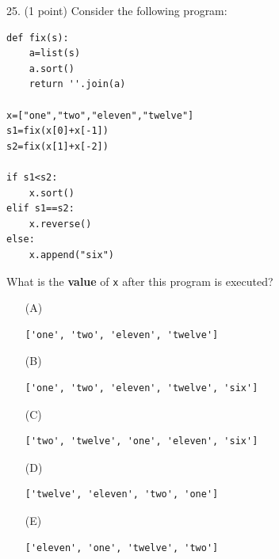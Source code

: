 \documentclass{article}
\begin{document}
\noindent
\begin{minipage}{\textwidth}
25. (1 point)
Consider the following program:
\begin{verbatim}
def fix(s):
    a=list(s)
    a.sort()
    return ''.join(a)

x=["one","two","eleven","twelve"]
s1=fix(x[0]+x[-1])
s2=fix(x[1]+x[-2])

if s1<s2:
    x.sort()
elif s1==s2:
    x.reverse()
else:
    x.append("six")
\end{verbatim}
What is the \textbf{value} of \texttt{x} after this program is executed?

\begin{enumerate}
\item[(A)]
\begin{verbatim}['one', 'two', 'eleven', 'twelve']\end{verbatim}

\item[(B)]
\begin{verbatim}['one', 'two', 'eleven', 'twelve', 'six']\end{verbatim}

\item[(C)]
\begin{verbatim}['two', 'twelve', 'one', 'eleven', 'six']\end{verbatim}

\item[(D)]
\begin{verbatim}['twelve', 'eleven', 'two', 'one']\end{verbatim}

\item[(E)]
\begin{verbatim}['eleven', 'one', 'twelve', 'two']\end{verbatim}

\end{enumerate}
\end{minipage}
\vspace{2em}
\filbreak\vfil{}\vfilneg
\end{document}
